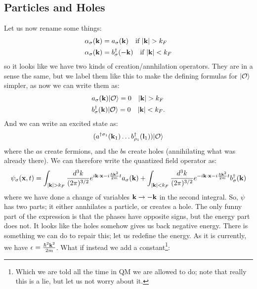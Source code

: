 \subsection{Particles and Holes}
Let us now rename some things:
\begin{equation}
    \begin{split}
        &\alpha_\sigma(\mathbf{k}) = a_\sigma(\mathbf{k}) \quad \text{if $\lvert \mathbf{k} \rvert > k_F$}
        \\ &\alpha_\sigma(\mathbf{k}) = b_\sigma^\dagger(-\mathbf{k}) \quad \text{if $\lvert \mathbf{k} \rvert < k_F$}
    \end{split}
\end{equation}
so it looks like we have two kinds of creation/annhilation operators. They are in a sense the same, but we label them like this to make the defining formulas for $\lvert \mathcal{O} \rangle$ simpler, as now we can write them as:
\begin{equation}
    \begin{split}
        &a_\sigma(\mathbf{k})\lvert \mathcal{O} \rangle = 0 \quad \lvert \mathbf{k} \rvert > k_F
        \\ &b^{\dagger}_\sigma(\mathbf{k})\lvert \mathcal{O} \rangle = 0 \quad \lvert \mathbf{k} \rvert < k_F.
    \end{split}
\end{equation}
And we can write an excited state as:
\begin{equation}
    (a^{\dagger\sigma_1}(\mathbf{k}_1)\ldots b^{\dagger}_{\rho_1}(\mathbf{l}_1))\lvert \mathcal{O} \rangle
\end{equation}
where the $a$s create fermions, and the $b$s create holes (annihilating what was already there). We can therefore write the quantized field operator as:
\begin{equation}
    \psi_\sigma(\mathbf{x}, t) = \int_{\lvert \mathbf{k} \rvert > k_F} \frac{d^3k}{(2\pi)^{3/2}}e^{i\mathbf{k} \cdot \mathbf{x} - i\frac{\hbar\mathbf{k}^2}{2m}t} a_\sigma(\mathbf{k}) + \int_{\lvert \mathbf{k} \rvert < k_F} \frac{d^3k}{(2\pi)^{3/2}}e^{-i\mathbf{k} \cdot \mathbf{x} - i\frac{\hbar\mathbf{k}^2}{2m}t} b^{\dagger}_\sigma(\mathbf{k})
\end{equation}
where we have done a change of variables $\mathbf{k} \to -\mathbf{k}$ in the second integral. So, $\psi$ has two parts; it either annhilates a particle, or creates a hole. The only funny part of the expression is that the phases have opposite signs, but the energy part does not. It looks like the holes somehow gives us back negative energy. There is something we can do to repair this; let us redefine the energy. As it is currently, we have $\epsilon = \frac{\hbar^2\mathbf{k}^2}{2m}$. What if instead we add a constant\footnote{Which we are told all the time in QM we are allowed to do; note that really this is a lie, but let us not worry about it.}:
